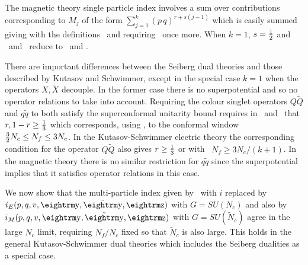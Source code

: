 The magnetic theory single particle
index involves a sum over contributions corresponding to $M_j$ of
the form $\sum_{j=1}^k (p\,q)^{r+s(j-1)}$ which is easily summed giving 
\eqn{}
with the definitions \ and requiring \vv\ once more. When $k=1$,
$s={\textstyle {1 \over 2}}$ and \ksel\ and \ksm\ reduce to \seiel\ and \seim.

There are important differences between the Seiberg dual theories and those
described by Kutasov and Schwimmer, except in the special case $k=1$ when
the operators $X,{\tilde X}$ decouple. In the former case there is no superpotential
and so no operator relations to take into account. Requiring the colour singlet 
operators $Q{\tilde Q}$ and $q{\tilde q}$ to both satisfy the superconformal 
unitarity bound requires in \seiel\ and \seim\ that  $r, 1-r \ge {1\over 3}$ which 
corresponds, using , to the conformal window ${3\over 2}N_c \le N_f \le 3N_c$.
In  the Kutasov-Schwimmer electric theory  the corresponding condition for the 
operator $Q{\tilde Q}$ also gives $r \ge {1\over 3}$ or with \  
$N_f \ge 3N_c/(k+1)$. In the magnetic theory there is no similar restriction for 
$q{\tilde q}$ since the superpotential implies that it satisfies
operator relations in this case.




We now show that  the multi-particle index  given by \itwo\ 
with $i$ replaced by $i_E (p,q,v,\y,{\tilde \y},\z)$ with $G=SU(N_c)$ 
and also by  $i_M (p,q,v,\y,{\tilde \y},\z)$ with $G=SU({\tilde N}_c)$ 
agree  in the large $N_c$ limit, requiring $N_f/N_c$ fixed so that
${\tilde N}_c$ is also large. This holds in the general Kutasov-Schwimmer
dual theories which includes the Seiberg dualities as a special case.

